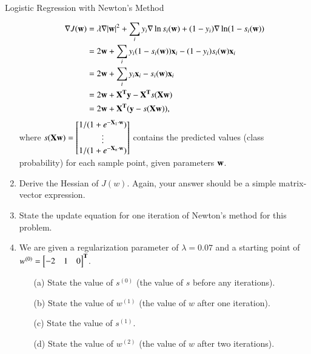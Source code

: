 \documentclass[section]{problemset}
\begin{document}
\begin{problem}{Logistic Regression with Newton's Method}
\begin{enumerate}
\begin{mdframed}
\begin{align*}
  \nabla J(\mathbf w)
  &= \lambda \nabla |\mathbf w|^2 + \sum_i
  y_i     \nabla \ln s_i(\mathbf w) +
  (1-y_i) \nabla \ln(1 - s_i(\mathbf w)) \\
  &= 2\mathbf w + \sum_i y_i (1 - s_i(\mathbf w))\mathbf x_i - (1 - y_i) s_i(\mathbf w)\mathbf x_i \\
  &= 2\mathbf w + \sum_i y_i\mathbf x_i - s_i(\mathbf w)\mathbf x_i \\
  &= 2\mathbf w + \mathbf X^{\mathbf{T}}\mathbf y - \mathbf X^{\mathbf{T}} s(\mathbf X\mathbf w) \\
  &= 2\mathbf w + \mathbf X^{\mathbf{T}}(\mathbf y - s(\mathbf X\mathbf w)),
\end{align*}
where
$s(\mathbf X\mathbf w) = \begin{bmatrix}1/(1+e^{-\mathbf X_1\cdot\mathbf w})\\\vdots\\1/(1+e^{-\mathbf X_n\cdot\mathbf w})\end{bmatrix}$
contains the predicted values (class probability) for each sample point, given
parameters $\mathbf w$.
\end{mdframed}


\item
Derive the Hessian of $J(w)$.
Again, your answer should be a simple matrix-vector expression.


\item State the update equation for one iteration of Newton's method for this problem.



\item
We are given a regularization parameter of $\lambda = 0.07$ and
a starting point of $w^{(0)} = \begin{bmatrix} -2 & 1 & 0 \end{bmatrix}^{\mathbf{T}}$.
\begin{itemize}
\item[(a)]
State the value of $s^{(0)}$ (the value of $s$ before any iterations).



\item[(b)]
State the value of $w^{(1)}$ (the value of $w$ after one iteration).


\item[(c)]
State the value of $s^{(1)}$.


\item[(d)]
State the value of $w^{(2)}$ (the value of $w$ after two iterations).

\end{itemize}
\end{enumerate}
\end{problem}




\end{document}
